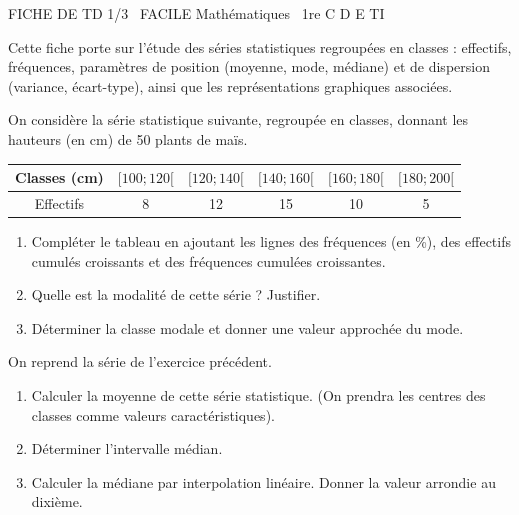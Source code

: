 \documentclass[11pt]{article}
\begin{document}
\begin{tcolorbox}[enhanced,colback=popink,colframe=popink,arc=10pt,boxrule=0pt,left=12pt,right=12pt,top=9pt,bottom=9pt]
{\color{white}\popxbold\small FICHE DE TD 1/3 \textbullet\ FACILE \hfill Mathématiques \textbullet\ 1re C D E TI\par}
\end{tcolorbox}
\vspace{4pt}
\noindent Cette fiche porte sur l'étude des séries statistiques regroupées en classes : effectifs, fréquences, paramètres de position (moyenne, mode, médiane) et de dispersion (variance, écart-type), ainsi que les représentations graphiques associées.

\begin{exercice}
On considère la série statistique suivante, regroupée en classes, donnant les hauteurs (en cm) de 50 plants de maïs.
\begin{center}
\begin{tabular}{|c|c|c|c|c|c|}
\hline
Classes (cm) & $[100;120[$ & $[120;140[$ & $[140;160[$ & $[160;180[$ & $[180;200[$ \\ \hline
Effectifs & 8 & 12 & 15 & 10 & 5 \\ \hline
\end{tabular}
\end{center}
\begin{enumerate}
    \item Compléter le tableau en ajoutant les lignes des fréquences (en \%), des effectifs cumulés croissants et des fréquences cumulées croissantes.
    \item Quelle est la modalité de cette série ? Justifier.
    \item Déterminer la classe modale et donner une valeur approchée du mode.
\end{enumerate}
\end{exercice}

\begin{exercice}
On reprend la série de l'exercice précédent.
\begin{enumerate}
    \item Calculer la moyenne de cette série statistique. (On prendra les centres des classes comme valeurs caractéristiques).
    \item Déterminer l'intervalle médian.
    \item Calculer la médiane par interpolation linéaire. Donner la valeur arrondie au dixième.
\end{enumerate}
\end{exercice}
\end{document}
